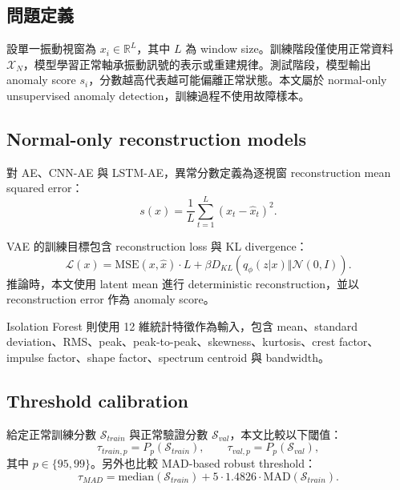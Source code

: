 \documentclass[12pt,a4paper]{article}
\begin{document}
\subsection{問題定義}

設單一振動視窗為 $x_i \in \mathbb{R}^{L}$，其中 $L$ 為 window size。訓練階段僅使用正常資料 $\mathcal{X}_{N}$，模型學習正常軸承振動訊號的表示或重建規律。測試階段，模型輸出 anomaly score $s_i$，分數越高代表越可能偏離正常狀態。本文屬於 normal-only unsupervised anomaly detection，訓練過程不使用故障樣本。

\subsection{Normal-only reconstruction models}

對 AE、CNN-AE 與 LSTM-AE，異常分數定義為逐視窗 reconstruction mean squared error：
\begin{equation}
s(x)=\frac{1}{L}\sum_{t=1}^{L}(x_t-\hat{x}_t)^2.
\end{equation}

VAE 的訓練目標包含 reconstruction loss 與 KL divergence：
\begin{equation}
\mathcal{L}(x)=\mathrm{MSE}(x,\hat{x})\cdot L+\beta D_{KL}(q_{\phi}(z|x)\Vert \mathcal{N}(0,I)).
\end{equation}
推論時，本文使用 latent mean 進行 deterministic reconstruction，並以 reconstruction error 作為 anomaly score。

Isolation Forest 則使用 12 維統計特徵作為輸入，包含 mean、standard deviation、RMS、peak、peak-to-peak、skewness、kurtosis、crest factor、impulse factor、shape factor、spectrum centroid 與 bandwidth。

\subsection{Threshold calibration}

給定正常訓練分數 $\mathcal{S}_{train}$ 與正常驗證分數 $\mathcal{S}_{val}$，本文比較以下閾值：
\begin{equation}
\tau_{train,p}=P_p(\mathcal{S}_{train}),\qquad \tau_{val,p}=P_p(\mathcal{S}_{val}),
\end{equation}
其中 $p\in\{95,99\}$。另外也比較 MAD-based robust threshold：
\begin{equation}
\tau_{MAD}=\mathrm{median}(\mathcal{S}_{train})+5\cdot 1.4826\cdot \mathrm{MAD}(\mathcal{S}_{train}).
\end{equation}
\end{document}
